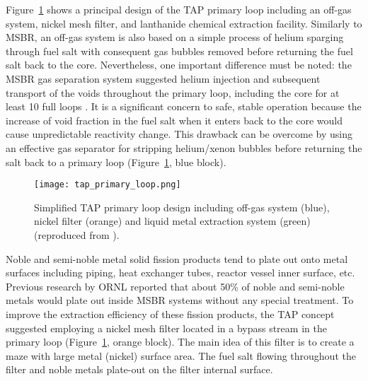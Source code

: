 Figure~\ref{fig:tap-reproc} shows a principal design of the \gls{TAP} primary 
loop including an off-gas system, nickel mesh filter, and lanthanide chemical 
extraction facility. Similarly to \gls{MSBR}, an off-gas system is also based 
on a simple process of helium sparging through fuel salt with consequent gas 
bubbles removed before returning the fuel salt back to the core. Nevertheless, 
one important difference must be noted: the \gls{MSBR} gas separation system 
suggested helium injection and subsequent transport of the voids throughout 
the primary loop, including the core for at least 10 full loops 
\cite{robertson_conceptual_1971}. It is a significant concern to safe, stable 
operation because the increase of void fraction in the fuel salt when it 
enters back to the core would cause unpredictable reactivity change. This 
drawback can be overcome by using an effective gas separator for stripping 
helium/xenon bubbles before returning the salt back to a primary loop 
(Figure~\ref{fig:tap-reproc}, blue block). 
\begin{figure}[htp!] %
	\centering
	\texttt{[image: tap\_primary\_loop.png]}
	\caption{Simplified \gls{TAP} primary loop design including off-gas system 
	(blue), 
		nickel filter (orange) and liquid metal extraction system (green) 
		(reproduced from \cite{transatomic_power_transatomic_2019}).}
	\label{fig:tap-reproc}
\end{figure}

Noble and semi-noble metal solid fission products tend to plate out onto metal 
surfaces including piping, heat exchanger tubes, reactor vessel inner surface, 
etc. Previous research by \gls{ORNL} \cite{robertson_conceptual_1971} reported 
that about 50\% of noble and semi-noble metals would plate out inside 
\gls{MSBR} systems without any special treatment. To improve the extraction 
efficiency of these fission products, the \gls{TAP} concept suggested 
employing a nickel mesh filter located in a bypass stream in the primary loop 
(Figure~\ref{fig:tap-reproc}, orange block). 
The main idea of this filter is to create a maze with large metal (nickel) 
surface area. The fuel salt flowing throughout the filter and noble 
metals plate-out on the filter internal surface. 

